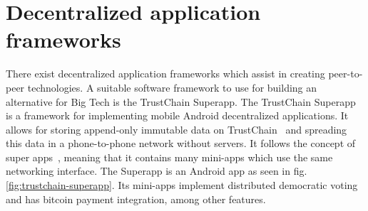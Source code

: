 
\section{Decentralized application frameworks}
\label{sec:sote-trustchain}
There exist decentralized application frameworks which assist in creating peer-to-peer technologies. A suitable software framework to use for building an alternative for Big Tech is the TrustChain Superapp. The TrustChain Superapp~\citep{mattskala2020} is a framework for implementing mobile Android decentralized applications. It allows for storing append-only immutable data on TrustChain~\citep{otte2017trustchain} and spreading this data in a phone-to-phone network without servers. It follows the concept of super apps~\citep{kpmg2019superapps}, meaning that it contains many mini-apps which use the same networking interface. The Superapp is an Android app as seen in fig. \ref{fig:trustchain-superapp}. Its mini-apps implement distributed democratic voting and has bitcoin payment integration, among other features.

